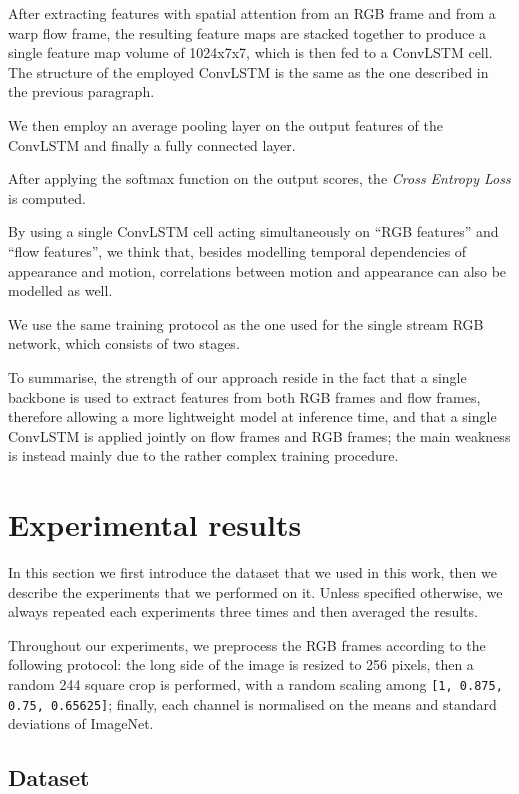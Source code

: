 \documentclass[10pt,twocolumn,letterpaper]{article}
\begin{document}
After extracting features with spatial attention from an RGB frame and from a warp flow frame, the resulting feature maps are stacked together to produce a single feature map volume of 1024x7x7, which is then fed to a ConvLSTM cell. The structure of the employed ConvLSTM is the same as the one described in the previous paragraph.

We then employ an average pooling layer on the output features of the ConvLSTM and finally a fully connected layer.

After applying the softmax function on the output scores, the \textit{Cross Entropy Loss} is computed.

By using a single ConvLSTM cell acting simultaneously on ``RGB features'' and ``flow features'', we think that, besides modelling temporal dependencies of appearance and motion, correlations between motion and appearance can also be modelled as well.

We use the same training protocol as the one used for the single stream RGB network, which consists of two stages.

To summarise, the strength of our approach reside in the fact that a single backbone is used to extract features from both RGB frames and flow frames, therefore allowing a more lightweight model at inference time, and that a single ConvLSTM is applied jointly on flow frames and RGB frames; the main weakness is instead mainly due to the rather complex training procedure.

\section{Experimental results}

In this section we first introduce the dataset that we used in this work, then we describe the experiments that we performed on it. Unless specified otherwise, we always repeated each experiments three times and then averaged the results.

Throughout our experiments, we preprocess the RGB frames according to the following protocol: the long side of the image is resized to 256 pixels, then a random 244 square crop is performed, with a random scaling among \texttt{[1, 0.875, 0.75, 0.65625]}; finally, each channel is normalised on the means and standard deviations of ImageNet.

\subsection{Dataset}
\end{document}
